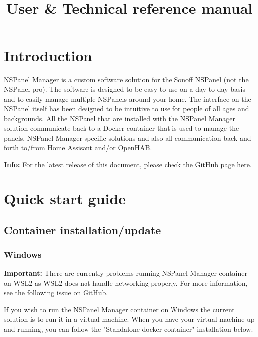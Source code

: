 \documentclass[10pt]{article}
\title{User \& Technical reference manual} %
\author{} %
\date{} %
\newcommand{\info}[1]{\begin{infoBox} \textbf{Info:} #1 \end{infoBox}}
\newcommand{\important}[1]{\begin{importantBox} \textbf{Important:} #1 \end{importantBox}}
\begin{document}
    \maketitle %

    \clearpage
    \tableofcontents
    \clearpage
    \section{Introduction} %
    NSPanel Manager is a custom software solution for the Sonoff NSPanel (not the NSPanel pro). The software is designed to be easy to use on a day to day basis and to easily manage multiple NSPanels around your home.
    The interface on the NSPanel itself has been designed to be intuitive to use for people of all ages and backgrounds.
    \bigbreak
    All the NSPanel that are installed with the NSPanel Manager solution communicate back to a Docker container that is used to manage the panels, NSPanel Manager specific solutions and also all communication back and forth to/from Home Assisant and/or OpenHAB.
    \bigbreak
    \info{For the latest release of this document, please check the GitHub page \href{https://github.com/tpanajott/NSPanelManager}{here}.}

    \clearpage
    \section{Quick start guide}
    \subsection{Container installation/update}
    \subsubsection{Windows}
    \important{There are currently problems running NSPanel Manager container on WSL2 as WSL2 does not handle networking properly. For more information, see the following \href{https://github.com/microsoft/WSL/issues/4150}{issue} on GitHub.}
    If you wish to run the NSPanel Manager container on Windows the current solution is to run it in a virtual machine. When you have your virtual machine up and running, you can follow the "Standalone docker container" installation below.
\end{document}
